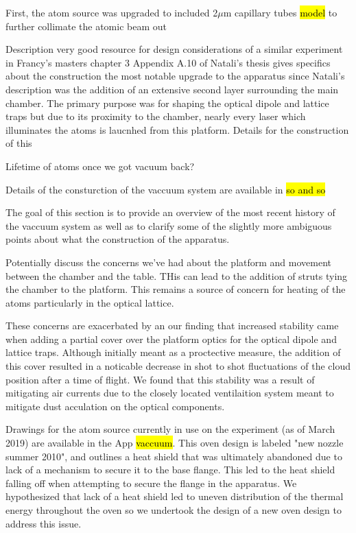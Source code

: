 First, the atom source was upgraded to included 2$\mu$m capillary tubes \hl{model} to further collimate the atomic beam out 


Description
	very good resource for design considerations of a similar experiment in Francy's masters chapter 3
	Appendix A.10 of Natali's thesis gives specifics about the construction
		the most notable upgrade to the apparatus since Natali's description was the addition of an extensive second layer surrounding the main chamber. The primary purpose was for shaping the optical dipole and lattice traps but due to its proximity to the chamber, nearly every laser which illuminates the atoms is laucnhed from this platform. Details for the construction of this 

	
	
	
	
Lifetime of atoms once we got vacuum back?

Details of the consturction of the vaccuum system are available in \hl{so and so}

The goal of this section is to provide an overview of the most recent history of the vaccuum system as well as to clarify some of the slightly more ambiguous points about what the construction of the apparatus.

Potentially discuss the concerns we've had about the platform and movement between the chamber and the table. THis can lead to the addition of struts tying the chamber to the platform. This remains a source of concern for heating of the atoms particularly in the optical lattice. 

These concerns are exacerbated by an our finding that increased stability came when adding a partial cover over the platform optics for the optical dipole and lattice traps. Although initially meant as a proctective measure, the addition of this cover resulted in a noticable decrease in shot to shot fluctuations of the cloud position after a time of flight. We found that this stability was a result of mitigating air currents due to the closely located ventilaition system meant to mitigate dust acculation on the optical components.

Drawings for the atom source currently in use on the experiment (as of March 2019) are available in the App \hl{vaccuum}. This oven design is labeled "new nozzle summer 2010", and outlines a heat shield that was ultimately abandoned due to lack of a mechanism to secure it to the base flange. This led to the heat shield falling off when attempting to secure the flange in the apparatus. We hypothesized that lack of a heat shield led to uneven distribution of the thermal energy throughout the oven so we undertook the design of a new oven design to address this issue.

